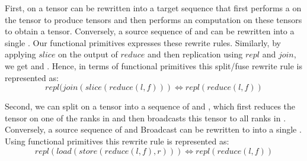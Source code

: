 First, \allreduce on a tensor can be rewritten into a target sequence that first performs a \reducescatter on the tensor to produce \sliced tensors and then performs an \allgather computation on these \sliced tensors to obtain a \replicated tensor.
Conversely, a source sequence of \reducescatter and \allgather can be rewritten into a single \allreduce.
Our functional primitives expresses these rewrite rules.
Similarly, by applying $slice$ on the output of $reduce$ and then replication using $repl$ and $join$, we get \reducescatter and \allgather.
Hence, in terms of functional primitives this split/fuse rewrite rule is represented as:
$$repl(join(slice(reduce(l, f))) \iff repl(reduce(l, f))$$

Second, we can split \allreduce on a tensor into a sequence of \reduce and \broadcast, which first reduces the tensor on one of the ranks in \WORLD and then broadcasts this tensor to all ranks in \WORLD.
Conversely, a source sequence of \reduce and Broadcast can be rewritten to into a single \allreduce.
Using functional primitives this rewrite rule is represented as:
\[
  repl(load(store(reduce(l, f), r))) \iff repl(reduce(l, f))
\]



